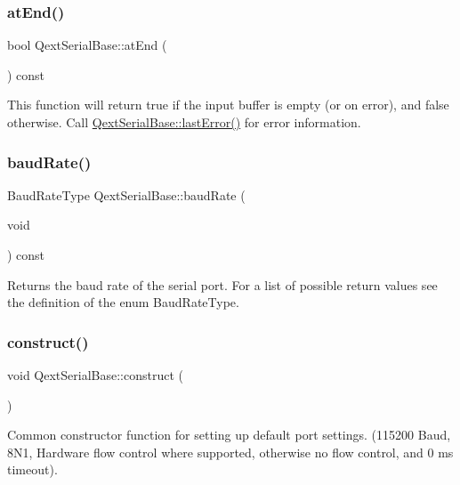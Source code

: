 \subsubsection{\texorpdfstring{at\+End()}{atEnd()}}
{\footnotesize\ttfamily bool Qext\+Serial\+Base\+::at\+End (\begin{DoxyParamCaption}{ }\end{DoxyParamCaption}) const\hspace{0.3cm}{\ttfamily [virtual]}}

This function will return true if the input buffer is empty (or on error), and false otherwise. Call \mbox{\hyperlink{class_qext_serial_base_a5889db7f578e11db0c7980de3720deea}{Qext\+Serial\+Base\+::last\+Error()}} for error information. \mbox{\label{class_qext_serial_base_ab85f4bc317e0b03205f4360529d8caf3}} 
\subsubsection{\texorpdfstring{baud\+Rate()}{baudRate()}}
{\footnotesize\ttfamily Baud\+Rate\+Type Qext\+Serial\+Base\+::baud\+Rate (\begin{DoxyParamCaption}\item[{void}]{ }\end{DoxyParamCaption}) const\hspace{0.3cm}{\ttfamily [virtual]}}

Returns the baud rate of the serial port. For a list of possible return values see the definition of the enum Baud\+Rate\+Type. \mbox{\label{class_qext_serial_base_a7495b472b5e269d04c0c2e856901207f}} 
\subsubsection{\texorpdfstring{construct()}{construct()}}
{\footnotesize\ttfamily void Qext\+Serial\+Base\+::construct (\begin{DoxyParamCaption}{ }\end{DoxyParamCaption})\hspace{0.3cm}{\ttfamily [virtual]}}

Common constructor function for setting up default port settings. (115200 Baud, 8\+N1, Hardware flow control where supported, otherwise no flow control, and 0 ms timeout). \mbox{\label{class_qext_serial_base_afebe4d557c5c944ccd1039cee91871fd}} 
